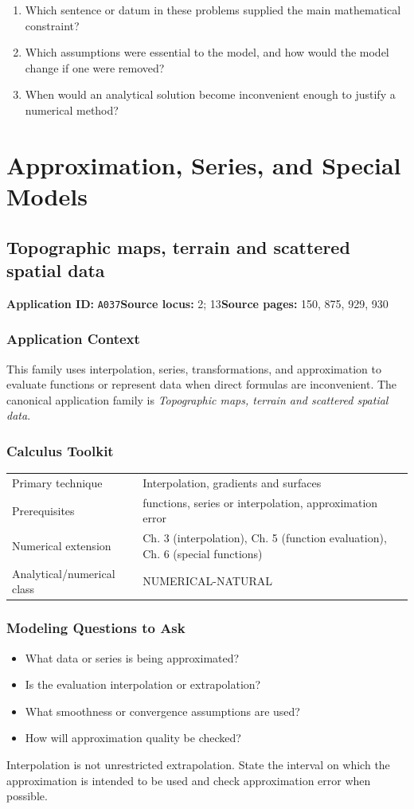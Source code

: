 \documentclass[11pt]{book}
\newcommand{\pid}[1]{\texttt{#1}}
\begin{document}
\begin{reflectionbox}\begin{enumerate}
\item Which sentence or datum in these problems supplied the main mathematical constraint?
\item Which assumptions were essential to the model, and how would the model change if one were removed?
\item When would an analytical solution become inconvenient enough to justify a numerical method?
\end{enumerate}\end{reflectionbox}
\part{Approximation, Series, and Special Models}
\chapter{Topographic maps, terrain and scattered spatial data}\label{app:A037}
\textbf{Application ID:} \pid{A037}\quad \textbf{Source locus:} 2; 13\quad \textbf{Source pages:} 150, 875, 929, 930
\section*{Application Context}
This family uses interpolation, series, transformations, and approximation to evaluate functions or represent data when direct formulas are inconvenient. The canonical application family is \emph{Topographic maps, terrain and scattered spatial data}.
\section*{Calculus Toolkit}
\begin{tabularx}{\textwidth}{@{}lX@{}}\toprule
Primary technique & Interpolation, gradients and surfaces \\
Prerequisites & functions, series or interpolation, approximation error \\
Numerical extension & Ch. 3 (interpolation), Ch. 5 (function evaluation), Ch. 6 (special functions) \\
Analytical/numerical class & NUMERICAL-NATURAL \\
\bottomrule\end{tabularx}
\section*{Modeling Questions to Ask}\begin{itemize}
\item What data or series is being approximated?
\item Is the evaluation interpolation or extrapolation?
\item What smoothness or convergence assumptions are used?
\item How will approximation quality be checked?
\end{itemize}
\begin{errorbox}Interpolation is not unrestricted extrapolation. State the interval on which the approximation is intended to be used and check approximation error when possible.\end{errorbox}
\end{document}
